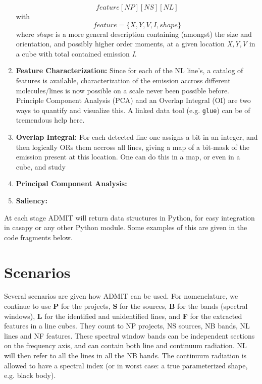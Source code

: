 \documentclass[preprint]{aastex} %
\begin{document}
\begin{enumerate}
$$
   feature[NP][NS][NL]
$$
with
$$
   feature = \{X, Y, V, I, shape\}
$$
where {\it shape} is a more general description containing (amongst) the size
and orientation, and possibly higher order moments, at a given location
{\it X,Y,V} in a cube with total contained emission {\it I}.


\item
{\bf Feature Characterization:}
Since for each of the NL line's, a catalog of features is available,
characterization of the emission accross different molecules/lines is now 
possible on a scale never been possible before. Principle Component
Analysis (PCA) and an Overlap Integral (OI) are two ways to quantify
and visualize this. A linked data tool (e.g. {\tt glue}) can be 
of tremendous help here.

\item
{\bf Overlap Integral:}
For each detected line one assigns a bit in an integer, and then logically ORs
them accross all lines, giving a map of a bit-mask of the emission present
at this location. One can do this in a map, or even in a cube, and study

\item
{\bf Principal Component Analysis:}


\item
{\bf Saliency:}

\end{enumerate}

At each stage ADMIT will return data structures in Python, for easy integration
in casapy or any other Python module. Some examples of this are given in the code
fragments below.

\section{Scenarios}

Several scenarios are given how ADMIT can be used.  For nomenclature, we continue
to use {\bf P} for
the projects, {\bf S} for the sources, {\bf B} for the bands (spectral windows), 
{\bf L} for the identified and unidentified lines, and {\bf F} for the extracted
features in a line cubes. They count to 
NP projects, NS sources, NB bands, NL lines and NF features.
These spectral window bands can be independent sections on the frequency axis, 
and can contain both line and continuum radiation. NL will then refer to all the
lines in all the NB bands.
The continuum radiation is allowed to have a spectral 
index (or in worst case: a true parameterized shape, e.g. black body).
\end{document}
